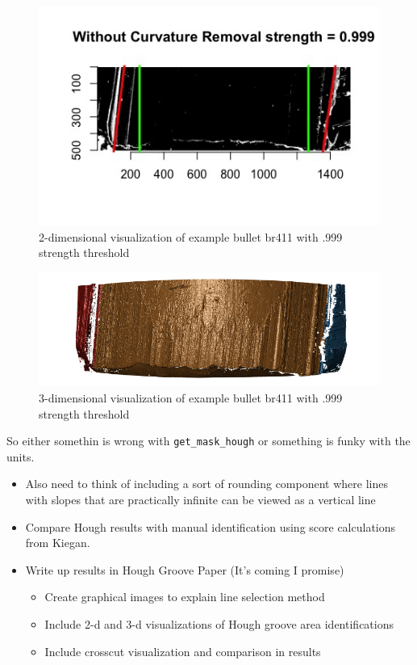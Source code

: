 \documentclass[]{book}
\providecommand{\tightlist}{%
  \setlength{\itemsep}{0pt}\setlength{\parskip}{0pt}}
\begin{document}
\begin{figure}

{\centering \includegraphics[width=0.5\linewidth]{images/charlotte/br411_2d} 

}

\caption{2-dimensional visualization of example bullet br411 with .999 strength threshold}\label{fig:unnamed-chunk-6}
\end{figure}

\begin{figure}

{\centering \includegraphics[width=0.5\linewidth]{images/charlotte/br411_3d} 

}

\caption{3-dimensional visualization of example bullet br411 with .999 strength threshold}\label{fig:unnamed-chunk-7}
\end{figure}

So either somethin is wrong with \texttt{get\_mask\_hough} or something is funky with the units.

\begin{itemize}
\item
  Also need to think of including a sort of rounding component where lines with slopes that are practically infinite can be viewed as a vertical line
\item
  Compare Hough results with manual identification using score calculations from Kiegan.
\item
  Write up results in Hough Groove Paper (It's coming I promise)

  \begin{itemize}
  \tightlist
  \item
    Create graphical images to explain line selection method
  \item
    Include 2-d and 3-d visualizations of Hough groove area identifications
  \item
    Include crosscut visualization and comparison in results
  \end{itemize}
\end{itemize}
\end{document}
